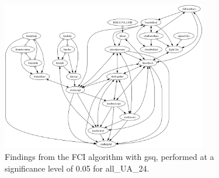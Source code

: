 \begin{figure}[htbp]
    \centering
    \includegraphics[width=0.8\textwidth]{FCI_gsq_0.05_all_UA_24.png}
    \caption{Findings from the FCI algorithm with gsq, performed at a significance level of 0.05 for all_UA_24.}
    \label{fig:fci_gsq_0.05all_UA_24}
\end{figure}
